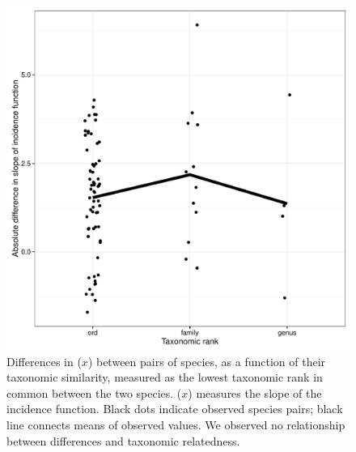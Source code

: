 \begin{figure}[htbp]
\centering
\includegraphics[width=5.5in]{figures/xbar.pdf}
\caption{Differences in (\(x\)) between pairs of species, as a function of
their taxonomic similarity, measured as the lowest taxonomic rank in
common between the two species. (\(x\)) measures
the slope of the incidence function. Black dots indicate observed
species pairs; black line connects means of observed values. We observed
no relationship between differences and taxonomic relatedness.}
\end{figure}

